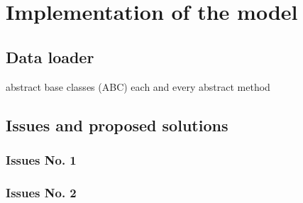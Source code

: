 
\chapter{Implementation of the model}\label{chapter:implementation_of_the_model}

\section{Data loader}
abstract base classes (ABC)
each and every abstract method
\section{Issues and proposed solutions}
\subsection{Issues No. 1}
\subsection{Issues No. 2}